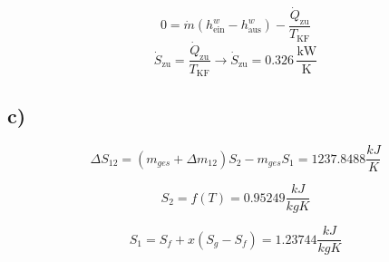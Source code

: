 

\item[c)] 
    \[
    0 = \dot{m} \left( h_{\text{ein}}^{w} - h_{\text{aus}}^{w} \right) - \frac{\dot{Q}_{\text{zu}}}{T_{\text{KF}}}
    \]
    \[
    \dot{S}_{\text{zu}} = \frac{\dot{Q}_{\text{zu}}}{T_{\text{KF}}} \rightarrow \dot{S}_{\text{zu}} = \boxed{0.326 \, \frac{\text{kW}}{\text{K}}}
    \]



\subsection*{c)}

\begin{equation*}
\Delta S_{12} = \left( m_{ges} + \Delta m_{12} \right) S_2 - m_{ges} S_1 = 1237.8488 \frac{kJ}{K}
\end{equation*}

\begin{equation*}
S_2 = f \left( T \right) = 0.95249 \frac{kJ}{kgK}
\end{equation*}

\begin{equation*}
S_1 = S_f + x \left( S_g - S_f \right) = 1.23744 \frac{kJ}{kgK}
\end{equation*}
